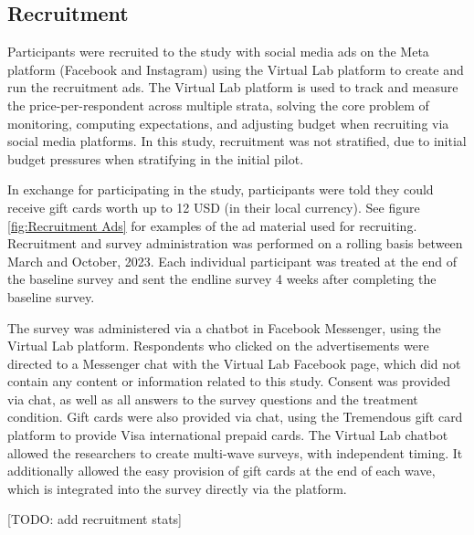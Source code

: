 \documentclass{article}
\begin{document}
\subsection*{Recruitment}

Participants were recruited to the study with social media ads on the Meta platform (Facebook and Instagram) using the Virtual Lab platform to create and run the recruitment ads. The Virtual Lab platform is used to track and measure the price-per-respondent across multiple strata, solving the core problem of monitoring, computing expectations, and adjusting budget when recruiting via social media platforms. In this study, recruitment was not stratified, due to initial budget pressures when stratifying in the initial pilot.

In exchange for participating in the study, participants were told they could receive gift cards worth up to 12 USD (in their local currency). See figure \ref{fig:Recruitment Ads} for examples of the ad material used for recruiting. Recruitment and survey administration was performed on a rolling basis between March and October, 2023. Each individual participant was treated at the end of the baseline survey and sent the endline survey 4 weeks after completing the baseline survey.

The survey was administered via a chatbot in Facebook Messenger, using the Virtual Lab platform. Respondents who clicked on the advertisements were directed to a Messenger chat with the Virtual Lab Facebook page, which did not contain any content or information related to this study. Consent was provided via chat, as well as all answers to the survey questions and the treatment condition. Gift cards were also provided via chat, using the Tremendous gift card platform to provide Visa international prepaid cards. The Virtual Lab chatbot allowed the researchers to create multi-wave surveys, with independent timing. It additionally allowed the easy provision of gift cards at the end of each wave, which is integrated into the survey directly via the platform.

[TODO: add recruitment stats]
\end{document}
